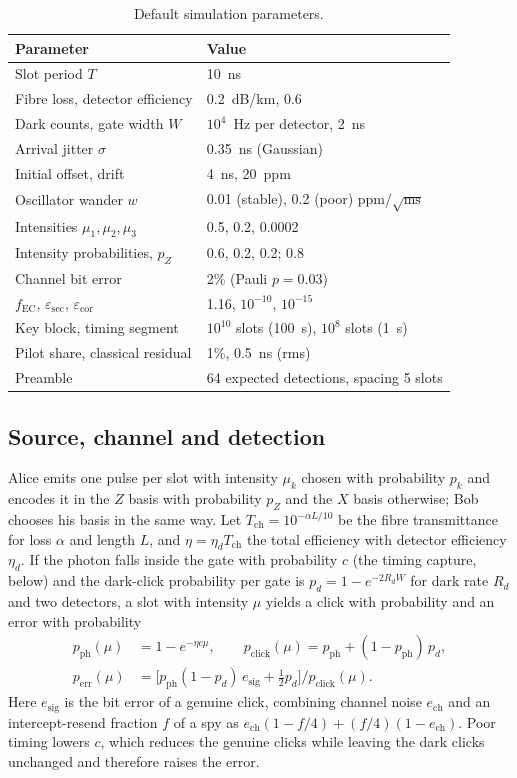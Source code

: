 \documentclass[journal]{IEEEtran}
\theoremstyle{plain}
\begin{document}
\begin{table}[t]
\caption{Default simulation parameters.}
\label{tab:params}
\centering
\small
\begin{tabular}{@{}ll@{}}
\toprule
Parameter & Value \\
\midrule
Slot period $T$ & 10~ns \\
Fibre loss, detector efficiency & 0.2~dB/km, 0.6 \\
Dark counts, gate width $W$ & $10^4$~Hz per detector, 2~ns \\
Arrival jitter $\sigma$ & 0.35~ns (Gaussian) \\
Initial offset, drift & 4~ns, 20~ppm \\
Oscillator wander $w$ & 0.01 (stable), 0.2 (poor) ppm/$\sqrt{\mathrm{ms}}$ \\
Intensities $\mu_1,\mu_2,\mu_3$ & 0.5, 0.2, 0.0002 \\
Intensity probabilities, $p_Z$ & 0.6, 0.2, 0.2; 0.8 \\
Channel bit error & 2\% (Pauli $p=0.03$) \\
$f_{\mathrm{EC}}$, $\varepsilon_{\mathrm{sec}}$, $\varepsilon_{\mathrm{cor}}$ & 1.16, $10^{-10}$, $10^{-15}$ \\
Key block, timing segment & $10^{10}$ slots (100~s), $10^{8}$ slots (1~s) \\
Pilot share, classical residual & 1\%, 0.5~ns (rms) \\
Preamble & 64 expected detections, spacing 5 slots \\
\bottomrule
\end{tabular}
\end{table}

\subsection{Source, channel and detection}
Alice emits one pulse per slot with intensity $\mu_k$ chosen with probability $p_k$ and encodes it in the $Z$ basis with probability $p_Z$ and the $X$ basis otherwise; Bob chooses his basis in the same way. Let $T_{\mathrm{ch}}=10^{-\alpha L/10}$ be the fibre transmittance for loss $\alpha$ and length $L$, and $\eta=\eta_d T_{\mathrm{ch}}$ the total efficiency with detector efficiency $\eta_d$. If the photon falls inside the gate with probability $c$ (the timing capture, below) and the dark-click probability per gate is $p_d=1-e^{-2R_d W}$ for dark rate $R_d$ and two detectors, a slot with intensity $\mu$ yields a click with probability and an error with probability
\begin{align}
p_{\mathrm{ph}}(\mu) &= 1-e^{-\eta c\mu}, \qquad p_{\mathrm{click}}(\mu)=p_{\mathrm{ph}}+(1-p_{\mathrm{ph}})\,p_d, \label{eq:click}\\
p_{\mathrm{err}}(\mu) &= \big[p_{\mathrm{ph}}(1-p_d)\,e_{\mathrm{sig}}+\tfrac12 p_d\big]/p_{\mathrm{click}}(\mu). \label{eq:err}
\end{align}
Here $e_{\mathrm{sig}}$ is the bit error of a genuine click, combining channel noise $e_{\mathrm{ch}}$ and an intercept-resend fraction $f$ of a spy as $e_{\mathrm{ch}}(1-f/4)+(f/4)(1-e_{\mathrm{ch}})$. Poor timing lowers $c$, which reduces the genuine clicks while leaving the dark clicks unchanged and therefore raises the error.
\end{document}
